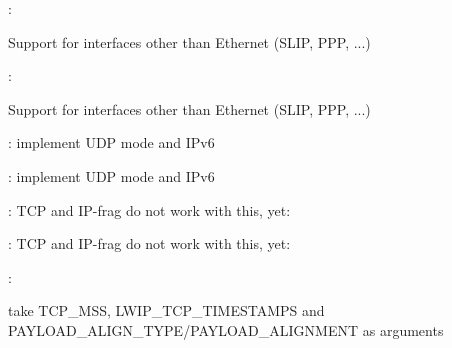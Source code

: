 
\begin{DoxyRefList}
\item[\label{todo__todo000009}%
\Hypertarget{todo__todo000009}%
Module \hyperlink{group__dhcp4}{dhcp4} ]\+:
\begin{DoxyItemize}
\item Support for interfaces other than Ethernet (S\+L\+IP, P\+PP, ...)
\end{DoxyItemize}

\+:
\begin{DoxyItemize}
\item Support for interfaces other than Ethernet (S\+L\+IP, P\+PP, ...) 
\end{DoxyItemize}
\item[\label{todo__todo000002}%
\Hypertarget{todo__todo000002}%
Module \hyperlink{group__iperf}{iperf} ]\+: implement U\+DP mode and I\+Pv6 

\+: implement U\+DP mode and I\+Pv6  
\item[\label{todo__todo000011}%
\Hypertarget{todo__todo000011}%
Member \hyperlink{group__lwip__opts__netif_gabafb9f64a80e51b56c0abbcfc1f7e04e}{L\+W\+I\+P\+\_\+\+N\+E\+T\+I\+F\+\_\+\+T\+X\+\_\+\+S\+I\+N\+G\+L\+E\+\_\+\+P\+B\+UF} ]\+: T\+CP and I\+P-\/frag do not work with this, yet\+: 

\+: T\+CP and I\+P-\/frag do not work with this, yet\+:  
\item[\label{todo__todo000001}%
\Hypertarget{todo__todo000001}%
Member \hyperlink{native_2lwip_2src_2apps_2httpd_2makefsdata_2makefsdata_8c_a9876b64c23e0e5cec59f0c72305b6695}{M\+A\+K\+E\+F\+S\+\_\+\+S\+U\+P\+P\+O\+R\+T\+\_\+\+D\+E\+F\+L\+A\+TE} ]\+:
\begin{DoxyItemize}
\item take T\+C\+P\+\_\+\+M\+SS, L\+W\+I\+P\+\_\+\+T\+C\+P\+\_\+\+T\+I\+M\+E\+S\+T\+A\+M\+PS and P\+A\+Y\+L\+O\+A\+D\+\_\+\+A\+L\+I\+G\+N\+\_\+\+T\+Y\+P\+E/\+P\+A\+Y\+L\+O\+A\+D\+\_\+\+A\+L\+I\+G\+N\+M\+E\+NT as arguments 
\end{DoxyItemize}


\end{DoxyRefList}
